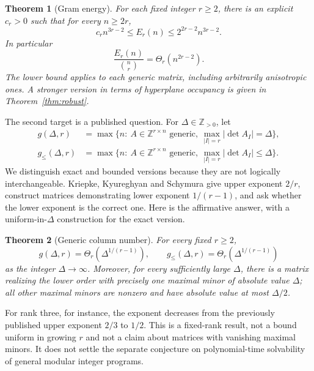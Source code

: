 \documentclass[11pt]{article}
\newtheorem{theorem}{Theorem}[section]
\theoremstyle{remark}\newtheorem{remark}[theorem]{Remark}
\newcommand{\Z}{\mathbb Z}\newcommand{\R}{\mathbb R}\newcommand{\F}{\mathbb F}
\begin{document}
\begin{theorem}[Gram energy]\label{thm:gram}
For each fixed integer $r\ge2$, there is an explicit $c_r>0$ such that for every $n\ge2r$,
\begin{equation}\label{eq:bounds}
 c_r n^{3r-2}\le E_r(n)\le 2^{2r-2}n^{3r-2}.
\end{equation}
In particular
\[
 \boxed{\displaystyle\frac{E_r(n)}{\binom nr}=\Theta_r(n^{2r-2}).}
\]
The lower bound applies to each generic matrix, including arbitrarily anisotropic ones. A stronger version in terms of hyperplane occupancy is given in Theorem~\ref{thm:robust}.
\end{theorem}

The second target is a published question. For $\Delta\in\Z_{>0}$, let
\begin{align*}
 g(\Delta,r)&=\max\{n:\ A\in\Z^{r\times n}\text{ generic},\ \max_{|I|=r}|\det A_I|=\Delta\},\\
 g_{\le}(\Delta,r)&=\max\{n:\ A\in\Z^{r\times n}\text{ generic},\ \max_{|I|=r}|\det A_I|\le\Delta\}.
\end{align*}
We distinguish exact and bounded versions because they are not logically interchangeable. Kriepke, Kyureghyan and Schymura \cite[Theorem 1.4, Proposition 3.3 and Question 3.4]{kks} give upper exponent $2/r$, construct matrices demonstrating lower exponent $1/(r-1)$, and ask whether the lower exponent is the correct one. Here is the affirmative answer, with a uniform-in-$\Delta$ construction for the exact version.

\begin{theorem}[Generic column number]\label{thm:column}
For every fixed $r\ge2$,
\begin{equation}\label{eq:g}
 \boxed{g(\Delta,r)=\Theta_r(\Delta^{1/(r-1)})},\qquad
 g_{\le}(\Delta,r)=\Theta_r(\Delta^{1/(r-1)})
\end{equation}
as the integer $\Delta\to\infty$. Moreover, for every sufficiently large $\Delta$, there is a matrix realizing the lower order with precisely one maximal minor of absolute value $\Delta$; all other maximal minors are nonzero and have absolute value at most $\Delta/2$.
\end{theorem}
For rank three, for instance, the exponent decreases from the previously published upper exponent $2/3$ to $1/2$. This is a fixed-rank result, not a bound uniform in growing $r$ and not a claim about matrices with vanishing maximal minors. It does not settle the separate conjecture on polynomial-time solvability of general modular integer programs.
\end{document}
